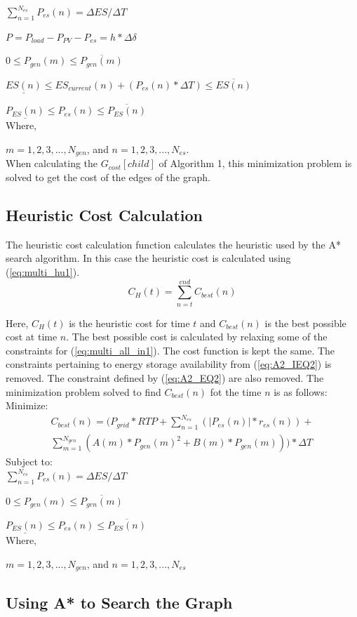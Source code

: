 $\sum_{n=1}^{N_{es}}P_{es}(n) = \Delta ES / \Delta T$

$P = P_{load} - P_{PV} - P_{es} = h*\Delta \delta $

$0 \leq P_{gen}(m) \leq \overline{P_{gen}(m)}$

$\underline{ES(n)} \leq ES_{current}(n)+(P_{es}(n)*\Delta T) \leq \overline{ES(n)}$

$\underline{P_{ES}(n)} \leq P_{es}(n) \leq \overline{P_{ES}(n)}$\\

Where,

$m = 1, 2, 3, ... , N_{gen}$, and $n = 1, 2, 3, ... , N_{es}$.\\

When calculating the $G_{cost}[child]$ of Algorithm 1, this minimization problem is solved to get the cost of the edges of the graph.
\subsection{Heuristic Cost Calculation}
The heuristic cost calculation function calculates the heuristic used by the A* search algorithm. In this case the heuristic cost is calculated using (\ref{eq:multi_hu1}).
\begin{equation}
\label{eq:multi_hu1}
    C_H(t) = \sum_{n=t}^{end} C_{best}(n)
\end{equation}

Here, $C_H(t)$ is the heuristic cost for time $t$ and $C_{best}(n)$ is the best possible cost at time $n$. The best possible cost is calculated by relaxing some of the constraints for (\ref{eq:multi_all_in1}). The cost function is kept the same. The constraints pertaining to energy storage availability from (\ref{eq:A2_IEQ2}) is removed. The constraint defined by (\ref{eq:A2_EQ2}) are also removed. The minimization problem solved to find $C_{best}(n)$ fot the time $n$ is as follows:\\
Minimize:
\begin{multline}
\label{eq:multi_hu2}
C_{best}(n)=(P_{grid} * RTP + \sum_{n=1}^{N_{es}} (|P_{es}(n)|*r_{es}(n)) +\\ \sum_{m=1}^{N_{gen}}(A(m)*P_{gen}(m)^2 + B(m)*P_{gen}(m)))*\Delta T
\end{multline}
Subject to:\\

$\sum_{n=1}^{N_{es}}P_{es}(n) = \Delta ES / \Delta T$


$0 \leq P_{gen}(m) \leq \overline{P_{gen}(m)}$


$\underline{P_{ES}(n)} \leq P_{es}(n) \leq \overline{P_{ES}(n)}$\\

Where,

$m = 1, 2, 3, ... , N_{gen}$, and $n = 1, 2, 3, ... , N_{es}$

\subsection{Using A* to Search the Graph}
